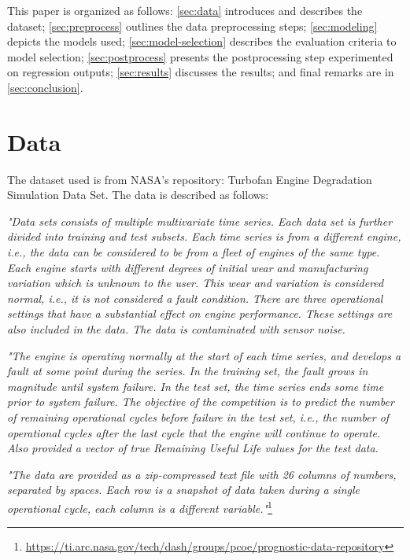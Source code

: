 \documentclass[letterpaper, 10 pt, conference, onecolumn]{ieeeconf}  %
\begin{document}
This paper is organized as follows: \autoref{sec:data} introduces and describes the dataset; \autoref{sec:preprocess} outlines the data preprocessing steps; \autoref{sec:modeling} depicts the models used; \autoref{sec:model-selection} describes the evaluation criteria to model selection; \autoref{sec:postprocess} presents the postprocessing step experimented on regression outputs; \autoref{sec:results} discusses the results; and final remarks are in \autoref{sec:conclusion}.


\section{Data}\label{sec:data}
The dataset used is from NASA's repository: Turbofan Engine Degradation Simulation Data Set. The data is described as follows:

\textit{"Data sets consists of multiple multivariate time series. Each data set is further divided into training and test subsets. Each time series is from a different engine, i.e., the data can be considered to be from a fleet of engines of the same type. Each engine starts with different degrees of initial wear and manufacturing variation which is unknown to the user. This wear and variation is considered normal, i.e., it is not considered a fault condition. There are three operational settings that have a substantial effect on engine performance. These settings are also included in the data. The data is contaminated with sensor noise.}

\textit{"The engine is operating normally at the start of each time series, and develops a fault at some point during the series. In the training set, the fault grows in magnitude until system failure. In the test set, the time series ends some time prior to system failure. The objective of the competition is to predict the number of remaining operational cycles before failure in the test set, i.e., the number of operational cycles after the last cycle that the engine will continue to operate. Also provided a vector of true Remaining Useful Life values for the test data.}

\textit{"The data are provided as a zip-compressed text file with 26 columns of numbers, separated by spaces. 
Each row is a snapshot of data taken during a single operational cycle, each column is a different variable."}\footnote{\url{https://ti.arc.nasa.gov/tech/dash/groups/pcoe/prognostic-data-repository}}
\end{document}
